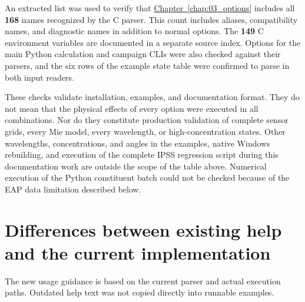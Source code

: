An extracted list was used to verify that \hyperref[chap:03_options]{Chapter~\ref*{chap:03_options}} includes all \textbf{168} names recognized by the C parser. This count includes aliases, compatibility names, and diagnostic names in addition to normal options. The \textbf{149} C environment variables are documented in a separate source index. Options for the main Python calculation and campaign CLIs were also checked against their parsers, and the six rows of the example state table were confirmed to parse in both input readers.

These checks validate installation, examples, and documentation format. They do not mean that the physical effects of every option were executed in all combinations. Nor do they constitute production validation of complete sensor grids, every Mie model, every wavelength, or high-concentration states. Other wavelengths, concentrations, and angles in the examples, native Windows rebuilding, and execution of the complete IPSS regression script during this documentation work are outside the scope of the table above. Numerical execution of the Python constituent batch could not be checked because of the EAP data limitation described below.

\section{Differences between existing help and the current implementation}
\label{sec:auto:07_validation_notes:2}
The new usage guidance is based on the current parser and actual execution paths. Outdated help text was not copied directly into runnable examples.


